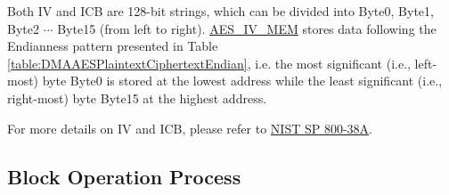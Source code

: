 \documentclass[main\_\_EN.tex]{subfiles}
\begin{document}
Both IV and ICB are 128-bit strings, which can be divided into Byte0, Byte1, Byte2 \begin{math}\cdots\end{math} Byte15 (from left to right). \hyperref[memdesc:AESIVMEM]{AES\_IV\_MEM} stores data following the Endianness pattern presented in Table \ref{table:DMAAESPlaintextCiphertextEndian}, i.e. the most significant (i.e., left-most) byte Byte0 is stored at the lowest address while the least significant (i.e., right-most) byte Byte15 at the highest address.

For more details on IV and ICB, please refer to \href{https://nvlpubs.nist.gov/nistpubs/Legacy/SP/nistspecialpublication800-38a.pdf}{NIST SP 800-38A}.

\subsection{ Block Operation Process}
\end{document}
